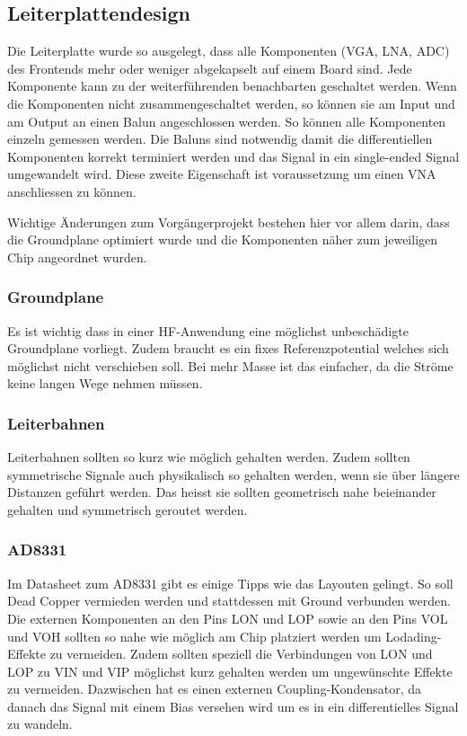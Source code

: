 \subsection{Leiterplattendesign}
\label{subsec:Leiterplattendesign}
Die Leiterplatte wurde so ausgelegt, dass alle Komponenten (VGA, LNA, ADC) des Frontends mehr oder weniger abgekapselt auf einem Board sind. Jede Komponente kann zu der weiterführenden benachbarten geschaltet werden. Wenn die Komponenten nicht zusammengeschaltet werden, so können sie am Input und am Output an einen Balun angeschlossen werden. So können alle Komponenten einzeln gemessen werden. Die Baluns sind notwendig damit die differentiellen Komponenten korrekt terminiert werden und das Signal in ein single-ended Signal umgewandelt wird. Diese zweite Eigenschaft ist voraussetzung um einen VNA anschliessen zu können.

Wichtige Änderungen zum Vorgängerprojekt bestehen hier vor allem darin, dass die Groundplane optimiert wurde und die Komponenten näher zum jeweiligen Chip angeordnet wurden.

\subsubsection*{Groundplane}
Es ist wichtig dass in einer HF-Anwendung eine möglichst unbeschädigte Groundplane vorliegt. Zudem braucht es ein fixes Referenzpotential welches sich möglichst nicht verschieben soll. Bei mehr Masse ist das einfacher, da die Ströme keine langen Wege nehmen müssen.

\subsubsection*{Leiterbahnen}
Leiterbahnen sollten so kurz wie möglich gehalten werden. Zudem sollten symmetrische Signale auch physikalisch so gehalten werden, wenn sie über längere Distanzen geführt werden. Das heisst sie sollten geometrisch nahe beieinander gehalten und symmetrisch geroutet werden. 

\subsubsection*{AD8331}
Im Datasheet zum AD8331 gibt es einige Tipps wie das Layouten gelingt. So soll Dead Copper vermieden werden und stattdessen mit Ground verbunden werden.
Die externen Komponenten an den Pins LON und LOP sowie an den Pins VOL und VOH sollten so nahe wie möglich am Chip platziert werden um Lodading-Effekte zu vermeiden.
Zudem sollten speziell die Verbindungen von LON und LOP zu VIN und VIP möglichst kurz gehalten werden um ungewünschte Effekte zu vermeiden. Dazwischen hat es einen externen Coupling-Kondensator, da danach das Signal mit einem Bias versehen wird um es in ein differentielles Signal zu wandeln.

